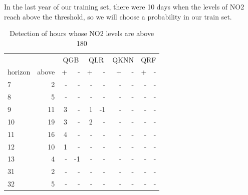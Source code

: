 \documentclass[a4paper,twocolumn,5p]{elsarticle}
\begin{document}
In the last year of our training set, there were 10 days when the 
levels of NO2 reach above the threshold, so we will choose a probability in 
our train set.

\begin{table}[tbp]
  \centering
  \caption{
    Detection of hours whose NO2 levels are above 180
  }
  \begin{tabular}{lr|rr|rr|rr|rr}
    \toprule 
    \multicolumn{2}{c}{} & \multicolumn{2}{c}{QGB} & \multicolumn{2}{c}{QLR} & \multicolumn{2}{c}{QKNN} & \multicolumn{2}{c}{QRF}   \\
    horizon &  above &  + &  - &  + &  - &  + &  - &  + &  - \\
    \midrule
    7  &                 2 &             - &                   - &             - &                   - &              - &                    - &             - &                   - \\
8  &                 5 &             - &                   - &             - &                   - &              - &                    - &             - &                   - \\
9  &                11 &              3 &                   - &              1 &                   -1 &              - &                    - &             - &                   - \\
10 &                19 &              3 &                   - &              2 &                   - &              - &                    - &             - &                   - \\
11 &                16 &              4 &                   - &             - &                   - &              - &                    - &             - &                   - \\
12 &                10 &              1 &                   - &             - &                   - &              - &                    - &             - &                   - \\
13 &                 4 &             - &                   -1 &             - &                   - &              - &                    - &             - &                   - \\
31 &                 2 &             - &                   - &             - &                   - &              - &                    - &             - &                   - \\
32 &                 5 &             - &                   - &             - &                   - &              - &                    - &             - &                   - \\

\end{tabular}
\end{table}
\end{document}
